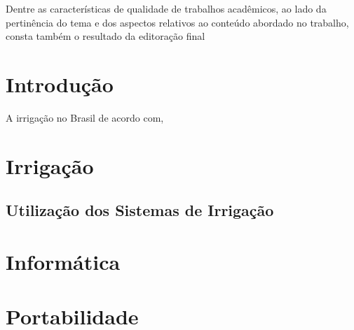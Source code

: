 \documentclass[12pt]{abntex2}
\begin{document}
\begin{citacao}
Dentre as características de qualidade de trabalhos acadêmicos,
ao lado da pertinência do tema e dos aspectos relativos ao conteúdo
abordado no trabalho, consta também o resultado da editoração final
\end{citacao}

\textual
\chapter{Introdução}
A irrigação no Brasil de acordo com, \cite[]{da2013analise}
\chapter{Irrigação}

\section{Utilização dos Sistemas de Irrigação}



\chapter{Informática}

\chapter{Portabilidade}



\end{document}
